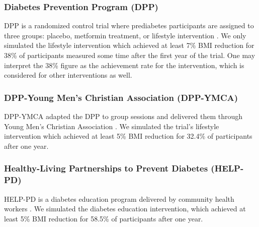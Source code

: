 \documentclass[fleqn,10pt]{wlscirep}
\begin{document}
\subsubsection*{Diabetes Prevention Program (DPP)}
DPP is a randomized control trial where prediabetes participants are assigned to three groups: placebo, metformin treatment, or lifestyle intervention \cite{diabetes:prevention:program:research:group:reduction:2002}. We only simulated the lifestyle intervention which achieved at least 7\% BMI reduction for 38\% of participants measured some time after the first year of the trial. One may interpret the 38\% figure as the achievement rate for the intervention, which is considered for other interventions as well.

\subsubsection*{DPP-Young Men's Christian Association (DPP-YMCA)}
DPP-YMCA adapted the DPP to group sessions and delivered them through Young Men’s Christian Association \cite{ackermann:randomized:2015}. We simulated the trial's lifestyle intervention which achieved at least 5\% BMI reduction for 32.4\% of participants after one year.

\subsubsection*{Healthy-Living Partnerships to Prevent Diabetes (HELP-PD)}
HELP-PD is a diabetes education program delivered by community health workers \cite{katula:one-year:2011,katula2013healthy}. We simulated the diabetes education intervention, which achieved at least 5\% BMI reduction for 58.5\% of participants after one year.
\end{document}
